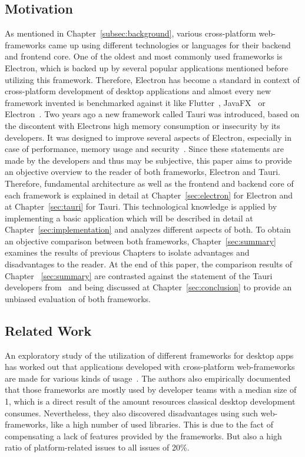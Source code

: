 \subsection{Motivation}\label{subsec:motivation}
As mentioned in Chapter~\ref{subsec:background}, various cross-platform web-frameworks came up using different technologies or languages for their backend and frontend core.
One of the oldest and most commonly used frameworks is Electron, which is backed up by several popular applications mentioned before utilizing this framework.
Therefore, Electron has become a standard in context of cross-platform development of desktop applications and almost every new framework invented is benchmarked against it like Flutter~\cite{flutter}, JavaFX~\cite{electron-javafx} or Electron~\cite{electron-nwjs}.
Two years ago a new framework called Tauri was introduced, based on the discontent with Electrons high memory consumption or insecurity by its developers.
It was designed to improve several aspects of Electron, especially in case of performance, memory usage and security~\cite{tauri}.
Since these statements are made by the developers and thus may be subjective, this paper aims to provide an objective overview to the reader of both frameworks, Electron and Tauri.
Therefore, fundamental architecture as well as the frontend and backend core of each framework is explained in detail at Chapter~\ref{sec:electron} for Electron and at Chapter~\ref{sec:tauri} for Tauri.
This technological knowledge is applied by implementing a basic application which will be described in detail at Chapter~\ref{sec:implementation} and analyzes different aspects of both.
To obtain an objective comparison between both frameworks, Chapter~\ref{sec:summary} examines the results of previous Chapters
to isolate advantages and disadvantages to the reader.
At the end of this paper, the comparison results of Chapter ~\ref{sec:summary} are contrasted against the statement of the Tauri developers from~\cite{tauri} and being discussed at Chapter~\ref{sec:conclusion} to provide an unbiased
evaluation of both frameworks.

\subsection{Related Work}\label{subsec:related-work}
An exploratory study of the utilization of different frameworks for desktop apps has worked out that applications developed with cross-platform web-frameworks are made for various kinds of usage~\cite{explorationstudy}.
The authors also empirically documented that those frameworks are mostly used by developer teams with a median size of 1, which is a direct result of the
amount resources classical desktop development consumes.
Nevertheless, they also discovered disadvantages using such web-frameworks, like a high number of used libraries.
This is due to the fact of compensating a lack of features provided by the frameworks.
But also a high ratio of platform-related issues to all issues of 20\%.

